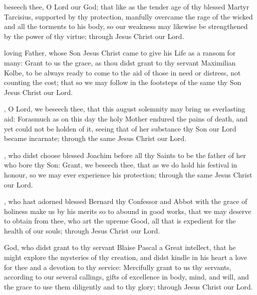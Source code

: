  beseech thee, O Lord our God; that like as the tender age of thy blessed Martyr Tarcisius, supported by thy protection, manfully overcame the rage of the wicked and all the torments to his body, so our weakness may likewise be strengthened by the power of thy virtue; through Jesus Christ our Lord.

 loving Father, whose Son Jesus Christ came to give his Life as a ransom for many: Grant to us the grace, as thou didst grant to thy servant Maximilian Kolbe, to be always ready to come to the aid of those in need or distress, not counting the cost; that so we may follow in the footsteps of the same thy Son Jesus Christ our Lord.

, O Lord, we beseech thee, that this august solemnity may bring us everlasting aid: Forasmuch as on this day the holy Mother endured the pains of death, and yet could not be holden of it, seeing that of her substance thy Son our Lord became incarnate; through the same Jesus Christ our Lord.

, who didst choose blessed Joachim before all thy Saints to be the father of her who bore thy Son: Grant, we beseech thee, that as we do hold his festival in honour, so we may ever experience his protection; through the same Jesus Christ our Lord.

, who hast adorned blessed Bernard thy Confessor and Abbot with the grace of holiness make us by his merits so to abound in good works, that we may deserve to obtain from thee, who art the upreme Good, all that is expedient for the health of our souls; through Jesus Christ our Lord.

 God, who didst grant to thy servant Blaise Pascal a Great intellect, that he might explore the mysteries of thy creation, and didst kindle in his heart a love for thee and a devotion to thy service: Mercifully grant to us thy servants, according to our several callings, gifts of excellence in body, mind, and will, and the grace to use them diligently and to thy glory; through Jesus Christ our Lord.

